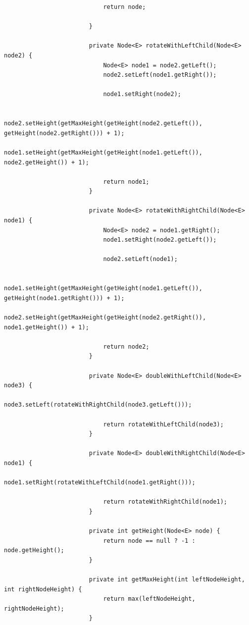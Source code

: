 \documentclass[a4paper, landscape, 8pt]{scrartcl}
\begin{document}
\begin{multicols*}{4}
\begin{lstlisting}
                            return node;

                        }

                        private Node<E> rotateWithLeftChild(Node<E> node2) {
                            Node<E> node1 = node2.getLeft();
                            node2.setLeft(node1.getRight());

                            node1.setRight(node2);

                            node2.setHeight(getMaxHeight(getHeight(node2.getLeft()), getHeight(node2.getRight())) + 1);
                            node1.setHeight(getMaxHeight(getHeight(node1.getLeft()), node2.getHeight()) + 1);

                            return node1;
                        }

                        private Node<E> rotateWithRightChild(Node<E> node1) {
                            Node<E> node2 = node1.getRight();
                            node1.setRight(node2.getLeft());

                            node2.setLeft(node1);

                            node1.setHeight(getMaxHeight(getHeight(node1.getLeft()), getHeight(node1.getRight())) + 1);
                            node2.setHeight(getMaxHeight(getHeight(node2.getRight()), node1.getHeight()) + 1);

                            return node2;
                        }

                        private Node<E> doubleWithLeftChild(Node<E> node3) {
                            node3.setLeft(rotateWithRightChild(node3.getLeft()));

                            return rotateWithLeftChild(node3);
                        }

                        private Node<E> doubleWithRightChild(Node<E> node1) {
                            node1.setRight(rotateWithLeftChild(node1.getRight()));

                            return rotateWithRightChild(node1);
                        }

                        private int getHeight(Node<E> node) {
                            return node == null ? -1 : node.getHeight();
                        }

                        private int getMaxHeight(int leftNodeHeight, int rightNodeHeight) {
                            return max(leftNodeHeight, rightNodeHeight);
                        }


\end{lstlisting}
\end{multicols*}
\end{document}
